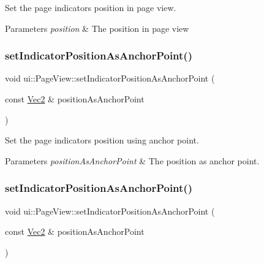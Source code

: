 Set the page indicator\textquotesingle{}s position in page view. 


\begin{DoxyParams}{Parameters}
{\em position} & The position in page view \\
\hline
\end{DoxyParams}
\mbox{\label{classui_1_1PageView_a72ad43bc3f2aaafc8bfba8244fc9c5bd}} 
\subsubsection{\texorpdfstring{set\+Indicator\+Position\+As\+Anchor\+Point()}{setIndicatorPositionAsAnchorPoint()}\hspace{0.1cm}{\footnotesize\ttfamily [1/2]}}
{\footnotesize\ttfamily void ui\+::\+Page\+View\+::set\+Indicator\+Position\+As\+Anchor\+Point (\begin{DoxyParamCaption}\item[{const \hyperlink{classVec2}{Vec2} \&}]{position\+As\+Anchor\+Point }\end{DoxyParamCaption})}



Set the page indicator\textquotesingle{}s position using anchor point. 


\begin{DoxyParams}{Parameters}
{\em position\+As\+Anchor\+Point} & The position as anchor point. \\
\hline
\end{DoxyParams}
\mbox{\label{classui_1_1PageView_a72ad43bc3f2aaafc8bfba8244fc9c5bd}} 
\subsubsection{\texorpdfstring{set\+Indicator\+Position\+As\+Anchor\+Point()}{setIndicatorPositionAsAnchorPoint()}\hspace{0.1cm}{\footnotesize\ttfamily [2/2]}}
{\footnotesize\ttfamily void ui\+::\+Page\+View\+::set\+Indicator\+Position\+As\+Anchor\+Point (\begin{DoxyParamCaption}\item[{const \hyperlink{classVec2}{Vec2} \&}]{position\+As\+Anchor\+Point }\end{DoxyParamCaption})}




